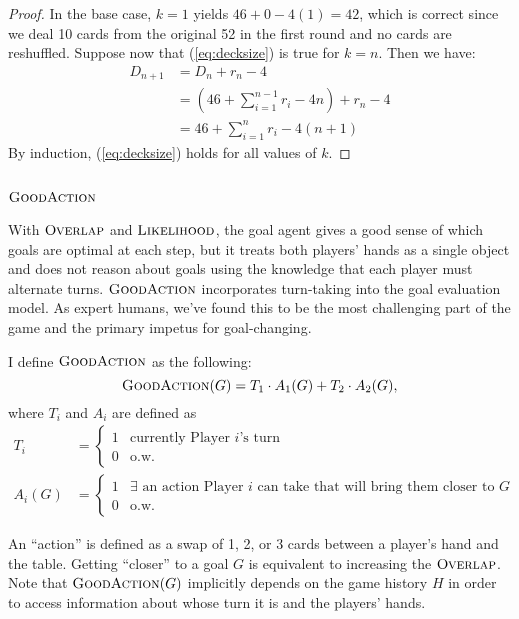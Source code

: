 \documentclass[11pt]{article}
\newcommand{\overlap}{\textsc{Overlap}}
\newcommand{\lkhd}{\textsc{Likelihood}}
\newcommand{\goodaction}{\textsc{GoodAction}}
\begin{document}
\begin{proof}
  In the base case, $k=1$ yields $46+0-4(1) = 42$, which is correct since we deal 10 cards from the original 52 in the first round and no cards are reshuffled. Suppose now that (\ref{eq:decksize}) is true for $k=n$. Then we have:
    \begin{align}
      D_{n+1} &= D_n + r_n - 4 \\
      &= (46 + \sum_{i=1}^{n-1} r_i - 4n) + r_n - 4 \\
      &= 46 + \sum_{i=1}^n r_i - 4(n+1)
    \end{align}
  By induction, (\ref{eq:decksize}) holds for all values of $k$.
\end{proof}

\subsection{$\goodaction$}

With $\overlap$ and $\lkhd$, the goal agent gives a good sense of which goals are optimal at each step, but it treats both players' hands as a single object and does not reason about goals using the knowledge that each player must alternate turns. $\goodaction$ incorporates turn-taking into the goal evaluation model. As expert humans, we've found this to be the most challenging part of the game and the primary impetus for goal-changing.

I define $\goodaction$ as the following:
\begin{equation}
  \goodaction(G) = T_1 \cdot A_1(G) + T_2 \cdot A_2(G),
\label{eq:goodaction} \end{equation}
where $T_i$ and $A_i$ are defined as
\begin{align}
  T_i &= \begin{cases}
    1 & \text{currently Player $i$'s turn} \\
    0 & \text{o.w.}
  \end{cases} \\
  A_i(G) &= \begin{cases}
    1 & \exists \text{ an action Player $i$ can take that will bring them closer to $G$} \\
    0 & \text{o.w.}
  \end{cases}
\end{align}

An ``action'' is defined as a swap of 1, 2, or 3 cards between a player's hand and the table. Getting ``closer'' to a goal $G$ is equivalent to increasing the $\overlap$. Note that $\goodaction(G)$ implicitly depends on the game history $H$ in order to access information about whose turn it is and the players' hands.
\end{document}
